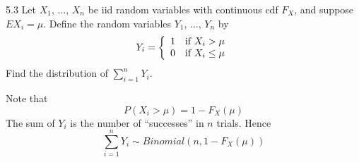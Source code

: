 \documentclass[12pt]{article}
\begin{document}
5.3
Let $X_1$, $\ldots$, $X_n$ be iid random variables with continuous
cdf $F_X$, and suppose $EX_i=\mu$.
Define the random variables $Y_1$, $\ldots$, $Y_n$ by
\begin{displaymath}
Y_i=\left\{
\begin{array}{ll}
1 & \hbox{if $X_i>\mu$}\\
0 & \hbox{if $X_i\le\mu$}
\end{array}\right.
\end{displaymath}
Find the distribution of $\sum_{i=1}^n Y_i$.

\bigskip
\noindent
Note that
$$P(X_i>\mu)=1-F_X(\mu)$$
The sum of $Y_i$ is the number of ``successes'' in $n$ trials.
Hence
$$\sum_{i=1}^n Y_i\sim Binomial(n,1-F_X(\mu))$$
\end{document}

